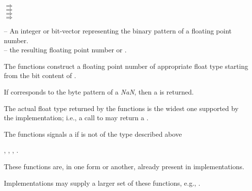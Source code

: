 \documentclass[../Float-Infinities-Nan.tex]{subfiles}
\begin{document}

\DSyntax{}

 
$\Rightarrow$ \\
 
$\Rightarrow$ \\
 
$\Rightarrow$ \\
 
$\Rightarrow$ 

\DArgsNValues{}

 -- An integer or bit-vector representing the binary
pattern of a floating point number.\\
 -- the resulting floating point number or .

\DDescription{}

The functions construct a floating point number of appropriate
float type starting from the bit content of
.

If  corresponds to the byte pattern of a \emph{NaN},
then a  is returned.

The actual float type returned by the functions is the widest one
supported by the implementation; i.e., a call to
 may return a .

\DExceptional{}

The functions signals a  if  is not of
the type described above

\DSeeAlso{}

, , , .

\DNotes{}

These functions are, in one form or another, already present in \CL{}
implementations.

Implementations may supply a larger set of these functions, e.g.,
.
\end{document}
